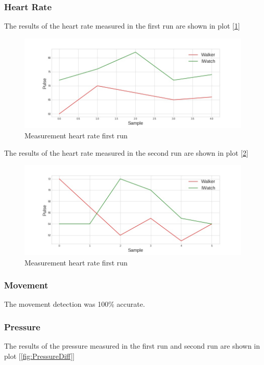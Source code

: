 		\subsubsection{Heart Rate}
			The results of the heart rate measured in the first run are shown in plot [\ref{fig:HeartRateFirst}]

			\begin{figure}[h!]
				\centering
				\includegraphics[width=1.1\linewidth]{gfx/pulse_run1_diff.jpg}
				\caption{Measurement heart rate first run}
				\label{fig:HeartRateFirst}
			\end{figure}
			\newpage
			The results of the heart rate measured in the second run are shown in plot [\ref{fig:HeartRateSecond}]

			\begin{figure}[h!]
				\centering
				\includegraphics[width=1.1\linewidth]{gfx/pulse_run2_diff.jpg}
				\caption{Measurement heart rate first run}
				\label{fig:HeartRateSecond}
			\end{figure}

		\subsubsection{Movement}
			The movement detection was 100\% accurate.

		\subsubsection{Pressure}
			The results of the pressure measured in the first run and second run are shown in plot [\ref{fig:PressureDiff}]
			

